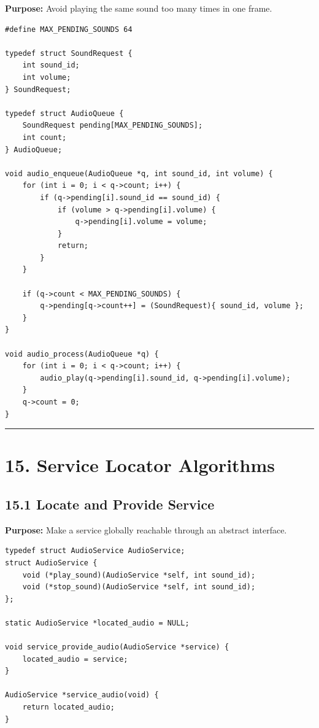 \documentclass[10pt,letterpaper]{article}
\begin{document}
\textbf{Purpose:} Avoid playing the same sound too many times in one frame.

\begin{verbatim}
#define MAX_PENDING_SOUNDS 64

typedef struct SoundRequest {
    int sound_id;
    int volume;
} SoundRequest;

typedef struct AudioQueue {
    SoundRequest pending[MAX_PENDING_SOUNDS];
    int count;
} AudioQueue;

void audio_enqueue(AudioQueue *q, int sound_id, int volume) {
    for (int i = 0; i < q->count; i++) {
        if (q->pending[i].sound_id == sound_id) {
            if (volume > q->pending[i].volume) {
                q->pending[i].volume = volume;
            }
            return;
        }
    }

    if (q->count < MAX_PENDING_SOUNDS) {
        q->pending[q->count++] = (SoundRequest){ sound_id, volume };
    }
}

void audio_process(AudioQueue *q) {
    for (int i = 0; i < q->count; i++) {
        audio_play(q->pending[i].sound_id, q->pending[i].volume);
    }
    q->count = 0;
}
\end{verbatim}

\medskip\hrule\medskip

\clearpage
\section{15. Service Locator Algorithms}

\subsection{15.1 Locate and Provide Service}

\textbf{Purpose:} Make a service globally reachable through an abstract interface.

\begin{verbatim}
typedef struct AudioService AudioService;
struct AudioService {
    void (*play_sound)(AudioService *self, int sound_id);
    void (*stop_sound)(AudioService *self, int sound_id);
};

static AudioService *located_audio = NULL;

void service_provide_audio(AudioService *service) {
    located_audio = service;
}

AudioService *service_audio(void) {
    return located_audio;
}
\end{verbatim}
\end{document}

